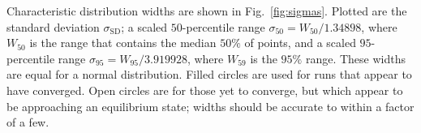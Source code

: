 \documentclass[useAMS,usedcolumn,usegraphicx,usenatbib]{mn2e}
\newcommand{\figref}[1]{Fig.~\ref{fig:#1}}
\newcommand{\sub}[1]{\ensuremath{_\mathrm{#1}}}
\begin{document}
Characteristic distribution widths are shown in \figref{sigmas}. Plotted are the standard deviation $\sigma\sub{SD}$; a scaled $50$-percentile range $\sigma_{50} = W_{50}/1.34898$, where $W_{50}$ is the range that contains the median $50\%$ of points, and a scaled $95$-percentile range $\sigma_{95} = W_{95}/3.919928$, where $W_{59}$ is the $95\%$ range. These widths are equal for a normal distribution. Filled circles are used for runs that appear to have converged. Open circles are for those yet to converge, but which appear to be approaching an equilibrium state; widths should be accurate to within a factor of a few.
\begin{figure}
\begin{center}
 \quad
{} \\
 \quad
{} \\

\end{center}
\end{figure}
\end{document}

